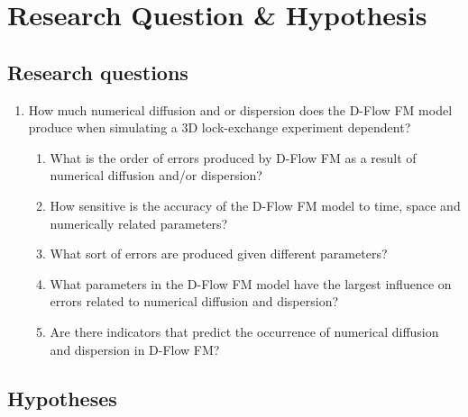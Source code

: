 \chapter{Research Question \& Hypothesis}\label{research-question-hypothesis}

\section{Research questions}\label{research-questions}

\begin{enumerate}
\def\labelenumi{\arabic{enumi}.}
\item
  How much numerical diffusion and or dispersion does the D-Flow FM
  model produce when simulating a 3D lock-exchange experiment dependent?

  \begin{enumerate}
  \def\labelenumii{\arabic{enumii}.}
  \item
    What is the order of errors produced by D-Flow FM as a result of
    numerical diffusion and/or dispersion?
  \item
    How sensitive is the accuracy of the D-Flow FM model to time, space
    and numerically related parameters?
  \item
    What sort of errors are produced given different parameters?
  \item
    What parameters in the D-Flow FM model have the largest influence on
    errors related to numerical diffusion and dispersion?
  \item
    Are there indicators that predict the occurrence of numerical
    diffusion and dispersion in D-Flow FM?
  \end{enumerate}
\end{enumerate}

\section{Hypotheses}\label{hypotheses}


